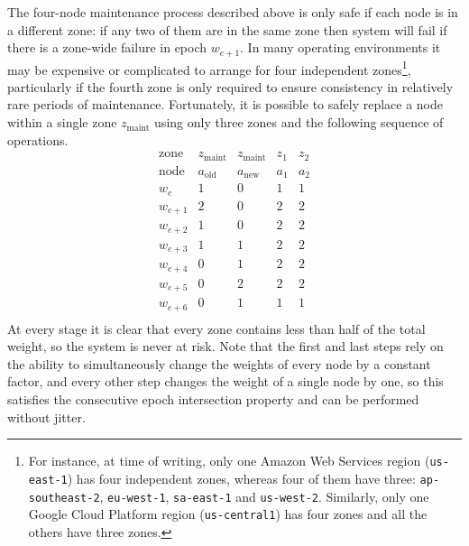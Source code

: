 \documentclass[journal]{IEEEtran}
\begin{document}
The four-node maintenance process described above is only safe if each node is
in a different zone: if any two of them are in the same zone then system will
fail if there is a zone-wide failure in epoch $w_{e+1}$.  In many operating
environments it may be expensive or complicated to arrange for four independent
zones\footnote{For instance, at time of writing, only one Amazon Web Services
region (\texttt{us-east-1}) has four independent zones, whereas four of them
have three: \texttt{ap-southeast-2}, \texttt{eu-west-1}, \texttt{sa-east-1} and
\texttt{us-west-2}. Similarly, only one Google Cloud Platform region
(\texttt{us-central1}) has four zones and all the others have three zones.},
particularly if the fourth zone is only required to ensure consistency in
relatively rare periods of maintenance.  Fortunately, it is possible to safely
replace a node within a single zone $z_{\textrm{maint}}$ using only three zones
and the following sequence of operations.
\[\begin{array}{rcccc}
\textrm{zone}&z_{\textrm{maint}}&z_{\textrm{maint}}&z_1&z_2\\
\textrm{node}&a_{\textrm{old}}&a_{\textrm{new}}&a_1&a_2\\
w_e&1&0&1&1\\
w_{e+1}&2&0&2&2\\
w_{e+2}&1&0&2&2\\
w_{e+3}&1&1&2&2\\
w_{e+4}&0&1&2&2\\
w_{e+5}&0&2&2&2\\
w_{e+6}&0&1&1&1\\
\end{array}\]
At every stage it is clear that every zone contains less than half of the total
weight, so the system is never at risk. Note that the first and last steps rely
on the ability to simultaneously change the weights of every node by a constant
factor, and every other step changes the weight of a single node by one, so
this satisfies the consecutive epoch intersection property and can be performed
without jitter.



%
%
\end{document}
